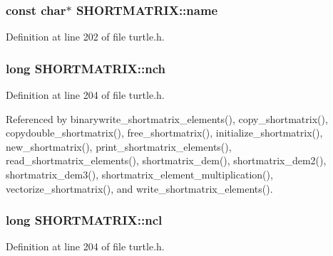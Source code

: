 \hypertarget{struct_s_h_o_r_t_m_a_t_r_i_x_a65f0dbe245bdbac3a531d9bb628a3fc4}{
\subsubsection[{name}]{\setlength{\rightskip}{0pt plus 5cm}const char$\ast$ S\-H\-O\-R\-T\-M\-A\-T\-R\-I\-X\-::name}}\label{struct_s_h_o_r_t_m_a_t_r_i_x_a65f0dbe245bdbac3a531d9bb628a3fc4}


Definition at line 202 of file turtle.\-h.

\hypertarget{struct_s_h_o_r_t_m_a_t_r_i_x_a14590f75e55c07c6e462c78d1645c7c8}{
\subsubsection[{nch}]{\setlength{\rightskip}{0pt plus 5cm}long S\-H\-O\-R\-T\-M\-A\-T\-R\-I\-X\-::nch}}\label{struct_s_h_o_r_t_m_a_t_r_i_x_a14590f75e55c07c6e462c78d1645c7c8}


Definition at line 204 of file turtle.\-h.



Referenced by binarywrite\-\_\-shortmatrix\-\_\-elements(), copy\-\_\-shortmatrix(), copydouble\-\_\-shortmatrix(), free\-\_\-shortmatrix(), initialize\-\_\-shortmatrix(), new\-\_\-shortmatrix(), print\-\_\-shortmatrix\-\_\-elements(), read\-\_\-shortmatrix\-\_\-elements(), shortmatrix\-\_\-dem(), shortmatrix\-\_\-dem2(), shortmatrix\-\_\-dem3(), shortmatrix\-\_\-element\-\_\-multiplication(), vectorize\-\_\-shortmatrix(), and write\-\_\-shortmatrix\-\_\-elements().

\hypertarget{struct_s_h_o_r_t_m_a_t_r_i_x_a8fd36d908f8120a9da49b7d6576e7fce}{
\subsubsection[{ncl}]{\setlength{\rightskip}{0pt plus 5cm}long S\-H\-O\-R\-T\-M\-A\-T\-R\-I\-X\-::ncl}}\label{struct_s_h_o_r_t_m_a_t_r_i_x_a8fd36d908f8120a9da49b7d6576e7fce}


Definition at line 204 of file turtle.\-h.



